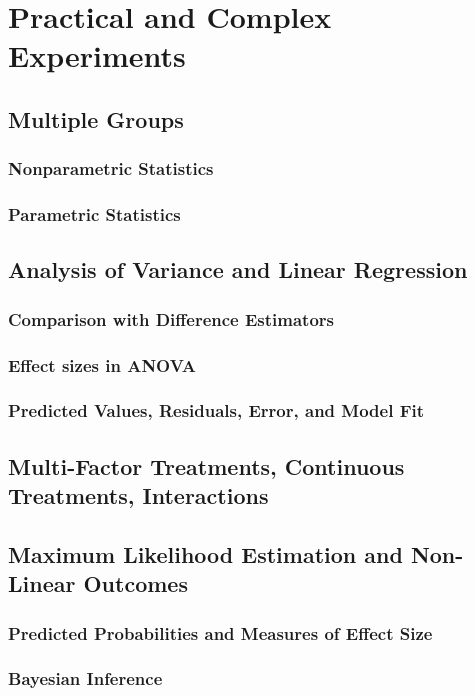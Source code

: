 \documentclass[12pt]{article}
\begin{document}
\section{Practical and Complex Experiments}
\subsection{Multiple Groups}
\subsubsection{Nonparametric Statistics}
\subsubsection{Parametric Statistics}

\subsection{Analysis of Variance and Linear Regression}
\subsubsection{Comparison with Difference Estimators}
\subsubsection{Effect sizes in ANOVA}
\subsubsection{Predicted Values, Residuals, Error, and Model Fit}
\subsection{Multi-Factor Treatments, Continuous Treatments, Interactions}

\subsection{Maximum Likelihood Estimation and Non-Linear Outcomes}
\subsubsection{Predicted Probabilities and Measures of Effect Size}
\subsubsection{Bayesian Inference}
\end{document}
